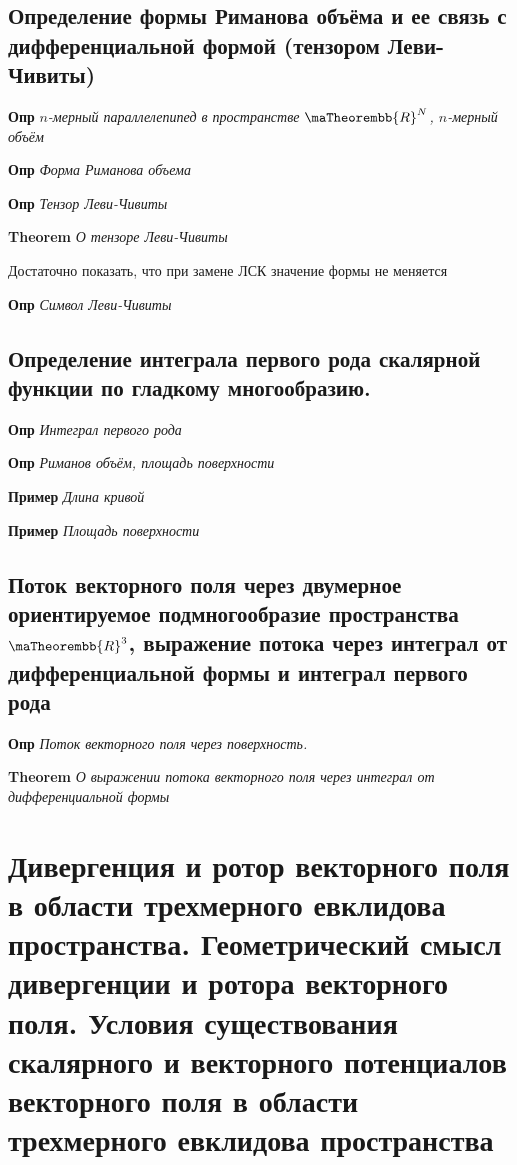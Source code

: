 \documentclass[a4paper, 14pt]{article}
\begin{document}
    \subsection{Определение формы Риманова объёма и ее связь с дифференциальной формой (тензором Леви-Чивиты)}
    
    \textbf{Опр} \textit{$n$-мерный параллелепипед в пространстве $\maTheorembb{R}^N$, $n$-мерный объём}
    
    \textbf{Опр} \textit{Форма Риманова объема}
    
    \textbf{Опр} \textit{Тензор Леви-Чивиты}
    
    \textbf{Theorem} \textit{О тензоре Леви-Чивиты}
    
    Достаточно показать, что при замене ЛСК значение формы не меняется
    
    \textbf{Опр} \textit{Символ Леви-Чивиты}
    
    \subsection{Определение интеграла первого рода скалярной функции по гладкому многообразию.}
    
    \textbf{Опр} \textit{Интеграл первого рода}
    
    \textbf{Опр} \textit{Риманов объём, площадь поверхности}
    
    \textbf{Пример} \textit{Длина кривой}
    
    \textbf{Пример} \textit{Площадь поверхности}
    
    \subsection{Поток векторного поля через двумерное ориентируемое подмногообразие пространства $\maTheorembb{R}^3$,
        выражение потока через интеграл от дифференциальной формы и интеграл первого рода}
    
    \textbf{Опр} \textit{Поток векторного поля через поверхность.}
    
    \textbf{Theorem} \textit{О выражении потока векторного поля через интеграл от дифференциальной формы}
    
    \section{Дивергенция и ротор векторного поля в области трехмерного евклидова пространства.
    Геометрический смысл дивергенции и ротора векторного поля.
    Условия существования скалярного и векторного потенциалов векторного поля в области трехмерного евклидова
    пространства}
    
\end{document}
